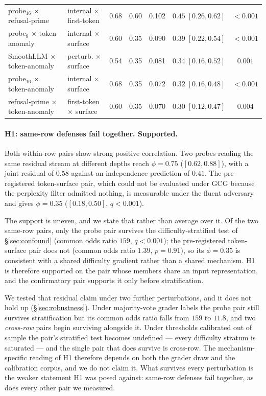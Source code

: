 \begin{table}[t]
\begin{tabular}{llccccc}
probe$_{16}$ $\times$ refusal-prime  & internal $\times$ first-token& 0.68 & 0.60 & 0.102 & $0.45\;[0.26,0.62]$ & $<0.001$ \\
probe$_{8}$ $\times$ token-anomaly   & internal $\times$ surface    & 0.60 & 0.35 & 0.090 & $0.39\;[0.22,0.54]$ & $<0.001$ \\
SmoothLLM $\times$ token-anomaly     & perturb. $\times$ surface    & 0.54 & 0.35 & 0.081 & $0.34\;[0.16,0.52]$ & $0.001$ \\
probe$_{16}$ $\times$ token-anomaly  & internal $\times$ surface    & 0.68 & 0.35 & 0.072 & $0.32\;[0.16,0.48]$ & $<0.001$ \\
refusal-prime $\times$ token-anomaly & first-token $\times$ surface & 0.60 & 0.35 & 0.070 & $0.30\;[0.12,0.47]$ & $0.004$ \\
\bottomrule
\end{tabular}
\end{table}

\paragraph{H1: same-row defenses fail together. Supported.}
Both within-row pairs show strong positive correlation. Two probes reading the same residual
stream at different depths reach $\phi=0.75$ ($[0.62,0.88]$), with a joint residual of $0.58$
against an independence prediction of $0.41$. The pre-registered token-surface pair, which
could not be evaluated under GCG because the perplexity filter admitted nothing, is
measurable under the fluent adversary and gives $\phi=0.35$ ($[0.18,0.50]$, $q<0.001$).

The support is uneven, and we state that rather than average over it. Of the two same-row
pairs, only the probe pair survives the difficulty-stratified test of \S\ref{sec:confound}
(common odds ratio $159$, $q<0.001$); the pre-registered token-surface pair does not (common
odds ratio $1.39$, $p=0.91$), so its $\phi=0.35$ is consistent with a shared difficulty
gradient rather than a shared mechanism. H1 is therefore supported on the pair whose members
share an input representation, and the confirmatory pair supports it only before
stratification.

We tested that residual claim under two further perturbations, and it does not hold up
(\S\ref{sec:robustness}). Under majority-vote grader labels the probe pair still survives
stratification but its common odds ratio falls from $159$ to $11.8$, and two \emph{cross-row}
pairs begin surviving alongside it. Under thresholds calibrated out of sample the pair's
stratified test becomes undefined --- every difficulty stratum is saturated --- and the single
pair that does survive is cross-row. The mechanism-specific reading of H1 therefore depends on
both the grader draw and the calibration corpus, and we do not claim it. What survives every
perturbation is the weaker statement H1 was posed against: same-row defenses fail together, as
does every other pair we measured.

